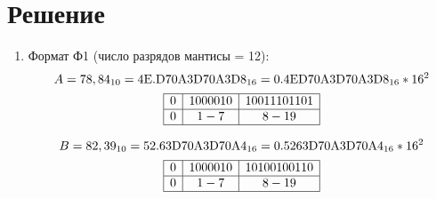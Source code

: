 \documentclass{article}
\begin{document}
\section{Решение}
\begin{enumerate}
       \item Формат Ф1 (число разрядов мантисы = 12):
             $$ A = 78,84_{10} = \textmd{4E.D70A3D70A3D8}_{16} = \textmd{0.4ED70A3D70A3D8}_{16} * 16^2 $$
             $$
                    \begin{array}{|c|c|c|}
                           \hline
                           0 & 1000010 & 10011101101 \\\hline
                           0 & 1 - 7   & 8 - 19 \\\hline
                    \end{array}
             $$
             
             $$ B = 82,39_{10} = \textmd{52.63D70A3D70A4}_{16} = \textmd{0.5263D70A3D70A4}_{16} * 16^2 $$
             $$
                    \begin{array}{|c|c|c|}
                           \hline
                           0 & 1000010 & 10100100110 \\\hline
                           0 & 1 - 7   & 8 - 19 \\\hline
                    \end{array}
             $$
             

\end{enumerate}
\end{document}
